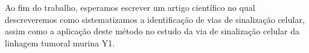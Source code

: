 \documentclass[12pt]{article}
\begin{document}
Ao fim do trabalho, esperamos escrever um artigo científico no qual
descreveremos como sistematizamos a identificação de vias de sinalização
celular, assim como a aplicação deste método no estudo da via de
sinalização celular da linhagem tumoral murina Y1.


 

\end{document}
